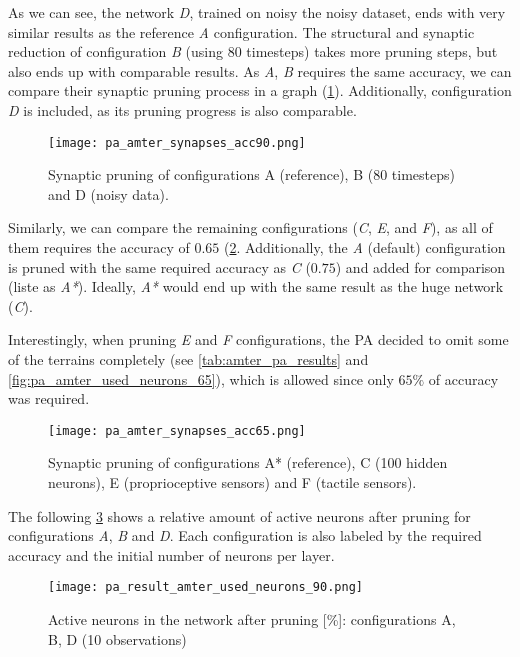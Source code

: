 As we can see, the network \textit{D}, trained on noisy the noisy dataset, ends with very similar results as the reference \textit{A} configuration. The structural and synaptic reduction of configuration \textit{B} (using 80 timesteps) takes more pruning steps, but also ends up with comparable results. As \textit{A}, \textit{B} requires the same accuracy, we can compare their synaptic pruning process in a graph (\cref{fig:pa_amter_synapses_90}). Additionally, configuration \textit{D} is included, as its pruning progress is also comparable.

\begin{figure}[H]
  \centering
  \texttt{[image: pa\_amter\_synapses\_acc90.png]}
  \caption{Synaptic pruning of configurations A (reference), B (80 timesteps) and D (noisy data).}
  \label{fig:pa_amter_synapses_90}
\end{figure}

Similarly, we can compare the remaining configurations (\textit{C}, \textit{E}, and \textit{F}), as all of them requires the accuracy of $ 0.65 $ (\cref{fig:pa_amter_synapses_65}. Additionally, the \textit{A} (default) configuration is pruned with the same required accuracy as \textit{C} ($ 0.75 $) and added for comparison (liste as \textit{A*}). Ideally, \textit{A*} would end up with the same result as the huge network (\textit{C}).

Interestingly, when pruning \textit{E} and \textit{F} configurations, the PA decided to omit some of the terrains completely (see \cref{tab:amter_pa_results} and \cref{fig:pa_amter_used_neurons_65}), which is allowed since only $ 65\% $ of accuracy was required. 

\begin{figure}[H]
  \centering
  \texttt{[image: pa\_amter\_synapses\_acc65.png]}
  \caption{Synaptic pruning of configurations A* (reference), C (100 hidden neurons), E (proprioceptive sensors) and F (tactile sensors).}
  \label{fig:pa_amter_synapses_65}
\end{figure}

The following \cref{fig:pa_amter_used_neurons_90} shows a relative amount of active neurons after pruning for configurations \textit{A}, \textit{B} and \textit{D}. Each configuration is also labeled by the required accuracy and the initial number of neurons per layer.

\begin{figure}[H]
  \centering
  \texttt{[image: pa\_result\_amter\_used\_neurons\_90.png]}
  \caption{Active neurons in the network after pruning [\%]: configurations A, B, D (10 observations)}
  \label{fig:pa_amter_used_neurons_90}
\end{figure}

